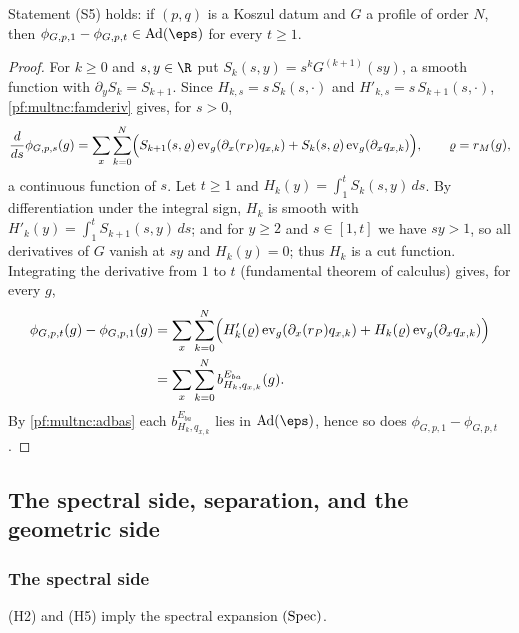 \begin{proposition}\label{pf:multnc:homot}
Statement (S5) holds: if $(p,q)$ is a Koszul datum and $G$ a profile of order $N$, then $\phi_{G,p,1}-\phi_{G,p,t}\in
\mathrm{Ad}(\eps)$ for every $t\ge1$.
\end{proposition}

\begin{proof}
For $k\ge0$ and $s,y\in\R$ put $S_k(s,y)=s^kG^{(k+1)}(sy)$, a smooth function with $\partial_yS_k=S_{k+1}$. Since
$H_{k,s}=s\,S_k(s,\cdot)$ and $H'_{k,s}=s\,S_{k+1}(s,\cdot)$, \cref{pf:multnc:famderiv} gives, for $s>0$,
\[
\frac{d}{ds}\phi_{G,p,s}(g)=\sum_x\sum_{k=0}^N\Bigl(S_{k+1}(s,\varrho)\,\mathrm{ev}_g(\partial_x(r_P)q_{x,k})+S_k(s,\varrho)\,
\mathrm{ev}_g(\partial_xq_{x,k})\Bigr),\qquad\varrho=r_M(g),
\]
a continuous function of $s$. Let $t\ge1$ and $H_k(y)=\int_1^tS_k(s,y)\,ds$. By differentiation under the integral sign,
$H_k$ is smooth with $H'_k(y)=\int_1^tS_{k+1}(s,y)\,ds$; and for $y\ge2$ and $s\in[1,t]$ we have $sy>1$, so all derivatives
of $G$ vanish at $sy$ and $H_k(y)=0$; thus $H_k$ is a cut function. Integrating the derivative from $1$ to $t$ (fundamental
theorem of calculus) gives, for every $g$,
\begin{align*}
\phi_{G,p,t}(g)-\phi_{G,p,1}(g)&=\sum_x\sum_{k=0}^N\Bigl(H'_k(\varrho)\,\mathrm{ev}_g(\partial_x(r_P)q_{x,k})+H_k(\varrho)\,
\mathrm{ev}_g(\partial_xq_{x,k})\Bigr)\\
&=\sum_x\sum_{k=0}^Nb^{E_{ba}}_{H_k,q_{x,k}}(g).
\end{align*}
By \cref{pf:multnc:adbas} each $b^{E_{ba}}_{H_k,q_{x,k}}$ lies in $\mathrm{Ad}(\eps)$, hence so does
$\phi_{G,p,1}-\phi_{G,p,t}$.
\end{proof}

\subsection{The spectral side, separation, and the geometric side}\label{pf:multnc:sec-sides}

\subsubsection*{The spectral side}

\begin{theorem}\label{pf:multnc:spectrace}
(H2) and (H5) imply the spectral expansion $\textup{(Spec)}$.
\end{theorem}

